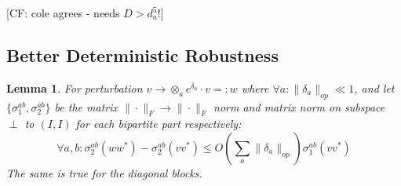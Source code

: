 \documentclass{article}
\newtheorem{lemma}[theorem]{Lemma}
\newcommand{\CF}[1]{{\color{purple}[CF: #1]}}
\begin{document}
\CF{cole agrees - needs $D > d_a^5!$}

\subsection{Better Deterministic Robustness}
\begin{lemma}\label{lem:block-perturbation-appendix}
For perturbation $v \to \otimes_{a} e^{\delta_{a}} \cdot v =: w$ where $\forall a: \|\delta_{a}\|_{op} \ll 1$, and let $\{\sigma_{1}^{ab}, \sigma_{2}^{ab}\}$ be the matrix $\|\cdot\|_{F} \to \|\cdot\|_{F}$ norm and matrix norm on subspace $\perp$ to $(I,I)$ for each bipartite part respectively:
\[ \forall a,b: \sigma_{2}^{ab}(w w^{*}) - \sigma_{2}^{ab}(v v^{*}) \leq O \left( \sum_{a} \|\delta_{a}\|_{op}  \right) \sigma_{1}^{ab}(v v^{*})   \]
The same is true for the diagonal blocks.
\end{lemma}
\end{document}
